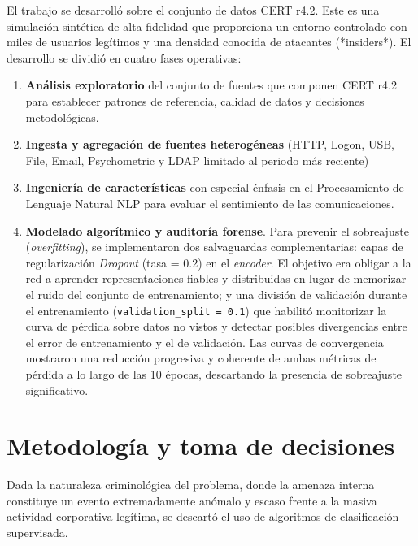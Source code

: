 \documentclass[IB]{TFUOC}%
\begin{document}
\medskip
\noindent El trabajo se desarrolló sobre el conjunto de datos CERT r4.2. Este es una simulación sintética de alta fidelidad que proporciona un entorno controlado con miles de usuarios legítimos y una densidad conocida de atacantes (*insiders*). El desarrollo se dividió en cuatro fases operativas: 
    \begin{enumerate}
        \item \textbf{Análisis exploratorio} del conjunto de fuentes que componen CERT r4.2 para establecer patrones de referencia, calidad de datos y decisiones metodológicas.
        \item \textbf{Ingesta y agregación de fuentes heterogéneas} (HTTP, Logon, USB, File, Email, Psychometric y LDAP limitado al periodo más reciente)
        \item \textbf{Ingeniería de características} con especial énfasis en el Procesamiento de Lenguaje Natural NLP para evaluar el sentimiento de las comunicaciones.
        \item \textbf{Modelado algorítmico y auditoría forense}. Para prevenir el sobreajuste (\textit{overfitting}), se implementaron dos salvaguardas complementarias: capas de regularización \textit{Dropout} (tasa = 0.2) en el \textit{encoder}. El objetivo era obligar a la red a aprender representaciones fiables y distribuidas en lugar de memorizar el ruido del conjunto de entrenamiento; y una división de validación durante el entrenamiento (\texttt{validation\_split = 0.1}) que habilitó monitorizar la curva de pérdida sobre datos no vistos y detectar posibles divergencias entre el error de entrenamiento y el de validación. Las curvas de convergencia mostraron una reducción progresiva y coherente de ambas métricas de pérdida a lo largo de las 10 épocas, descartando la presencia de sobreajuste significativo.
    \end{enumerate}
    
\section{Metodología y toma de decisiones}

Dada la naturaleza criminológica del problema, donde la amenaza interna constituye un evento extremadamente anómalo y escaso frente a la masiva actividad corporativa legítima, se descartó el uso de algoritmos de clasificación supervisada. 
\end{document}
